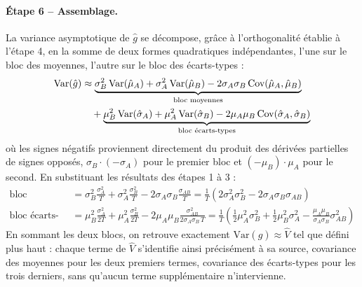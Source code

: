 \documentclass{article}
\begin{document}
\paragraph{Étape 6 -- Assemblage.} La variance asymptotique de $\hat g$ se décompose, grâce à l'orthogonalité établie à l'étape 4, en la somme de deux formes quadratiques indépendantes, l'une sur le bloc des moyennes, l'autre sur le bloc des écarts-types :
\begin{align}
\text{Var}(\hat g) &\approx \underbrace{\sigma_B^2\,\text{Var}(\hat\mu_A) + \sigma_A^2\,\text{Var}(\hat\mu_B) - 2\sigma_A\sigma_B\,\text{Cov}(\hat\mu_A,\hat\mu_B)}_{\text{bloc moyennes}} \notag \\
&\quad + \underbrace{\mu_B^2\,\text{Var}(\hat\sigma_A) + \mu_A^2\,\text{Var}(\hat\sigma_B) - 2\mu_A\mu_B\,\text{Cov}(\hat\sigma_A,\hat\sigma_B)}_{\text{bloc écarts-types}}
\end{align}
où les signes négatifs proviennent directement du produit des dérivées partielles de signes opposés, $\sigma_B\cdot(-\sigma_A)$ pour le premier bloc et $(-\mu_B)\cdot\mu_A$ pour le second. En substituant les résultats des étapes 1 à 3 :
\begin{align}
\text{bloc moyennes} &= \sigma_B^2\frac{\sigma_A^2}{T} + \sigma_A^2\frac{\sigma_B^2}{T} - 2\sigma_A\sigma_B\frac{\sigma_{AB}}{T} = \frac{1}{T}\left(2\sigma_A^2\sigma_B^2 - 2\sigma_A\sigma_B\sigma_{AB}\right) \\
\text{bloc écarts-types} &= \mu_B^2\frac{\sigma_A^2}{2T} + \mu_A^2\frac{\sigma_B^2}{2T} - 2\mu_A\mu_B\frac{\sigma_{AB}^2}{2\sigma_A\sigma_B\, T} = \frac{1}{T}\left(\frac{1}{2}\mu_A^2\sigma_B^2 + \frac{1}{2}\mu_B^2\sigma_A^2 - \frac{\mu_A\mu_B}{\sigma_A\sigma_B}\sigma_{AB}^2\right)
\end{align}
En sommant les deux blocs, on retrouve exactement $\text{Var}(\hat g)\approx\hat{V}$ tel que défini plus haut : chaque terme de $\hat{V}$ s'identifie ainsi précisément à sa source, covariance des moyennes pour les deux premiers termes, covariance des écarts-types pour les trois derniers, sans qu'aucun terme supplémentaire n'intervienne.
\end{document}
